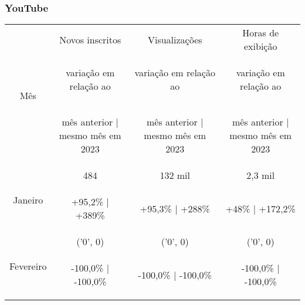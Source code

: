 \documentclass{article}%
\begin{document}
\subsubsection*{YouTube}%
\label{ssubsec:YouTube}%
\begin{minipage}{\textwidth}%
\centering%
\begin{tabular}{@{}|c|c|c|c|@{}}%
\toprule%
\multirow{3}{*}{Mês}&Novos inscritos&Visualizações&Horas de exibição\\%
&\begin{footnotesize}%
variação em relação ao%
\end{footnotesize}&\begin{footnotesize}%
variação em relação ao%
\end{footnotesize}&\begin{footnotesize}%
variação em relação ao%
\end{footnotesize}\\%
&\begin{footnotesize}%
mês anterior | mesmo mês em 2023%
\end{footnotesize}&\begin{footnotesize}%
mês anterior | mesmo mês em 2023%
\end{footnotesize}&\begin{footnotesize}%
mês anterior | mesmo mês em 2023%
\end{footnotesize}\\%
\midrule%
\multirow{2}{*}{Janeiro}&484&132 mil&2,3 mil\\%
&\begin{footnotesize}%
+95,2\% | +389\%%
\end{footnotesize}&\begin{footnotesize}%
+95,3\% | +288\%%
\end{footnotesize}&\begin{footnotesize}%
+48\% | +172,2\%%
\end{footnotesize}\\%
\midrule%
\multirow{2}{*}{Fevereiro}&('0', 0) &('0', 0) &('0', 0) \\%
&\begin{footnotesize}%
{-}100,0\% | {-}100,0\%%
\end{footnotesize}&\begin{footnotesize}%
{-}100,0\% | {-}100,0\%%
\end{footnotesize}&\begin{footnotesize}%
{-}100,0\% | {-}100,0\%%
\end{footnotesize}\\\bottomrule%
%
\end{tabular}%
\end{minipage}
\end{document}
